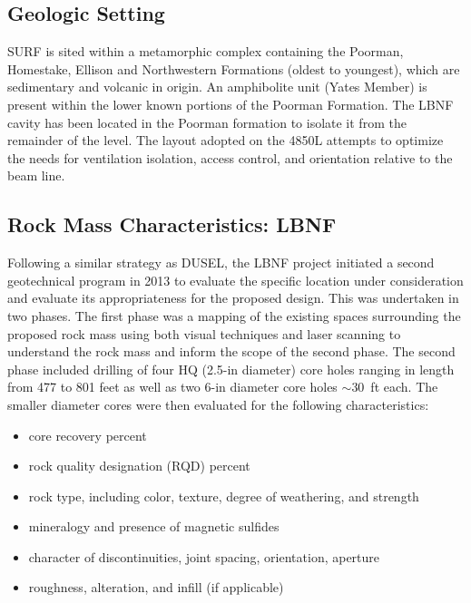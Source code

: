\subsection{Geologic Setting}
\label{sec:fscf-site-cond-geo-set}

SURF is sited within a metamorphic complex containing the Poorman, Homestake, Ellison and Northwestern Formations (oldest to youngest), which are sedimentary and volcanic in origin. An amphibolite unit (Yates Member) is present within the lower known portions of the Poorman Formation. The LBNF cavity has been located in the Poorman formation to isolate it from the remainder of the level. The layout adopted on the 4850L attempts to optimize the needs for ventilation isolation, access control, and orientation relative to the beam line.

\subsection{Rock Mass Characteristics: LBNF}
\label{sec:fscf-site-cond-geo-rock}

Following a similar strategy as DUSEL, the LBNF project initiated a second geotechnical program in 2013 to evaluate the specific location under consideration and evaluate its appropriateness for the proposed design.  This was undertaken in two phases.  The first phase was a mapping of the existing spaces surrounding the proposed rock mass using both visual techniques and laser scanning to understand the rock mass and inform the scope of the second phase.  The second phase included drilling of four HQ (2.5-in diameter) core holes ranging in length from 477 to 801 feet as well as two 6-in diameter core holes $\sim$30~ft each.  The smaller diameter cores were then evaluated for the following characteristics:

\begin{itemize}
 \item core recovery percent
 \item rock quality designation (RQD) percent
 \item rock type, including color, texture, degree of weathering, and strength
 \item mineralogy and presence of magnetic sulfides
 \item character of discontinuities, joint spacing, orientation, aperture
 \item roughness, alteration, and infill (if applicable)
\end{itemize}

